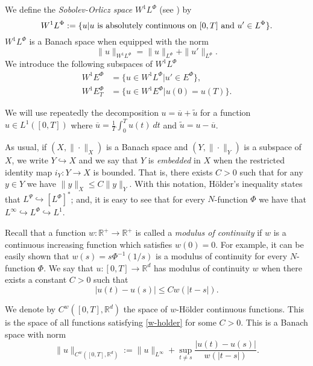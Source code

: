\documentclass[twoside]{article}
\theoremstyle{remark}
\newcommand{\orlnor}{\|_{L^{\Phi}}}
\newcommand{\lphi}{L^{\Phi}}
\newcommand{\lpsi}{L^{\Psi}}
\newcommand{\ephi}{E^{\Phi}}
\newcommand{\wphi}{W^{1}\lphi}
\newcommand{\wphie}{W^{1}\ephi}
\newcommand{\rr}{\mathbb{R}}
\renewcommand{\leq}{\leqslant}
\newcounter{example}
\begin{document}
We define the \emph{Sobolev-Orlicz space} $\wphi$ (see \cite{adams_sobolev}) by
\[\wphi:=\{u| u \hbox{ is absolutely continuous on $[0,T]$ and } u'\in \lphi\}.\]
$\wphi$ is a Banach space when equipped with the norm
\begin{equation}\label{def-norma-orlicz-sob}
\|  u  \|_{\wphi}= \|  u  \|_{\lphi} + \|u'\orlnor.
\end{equation}
We introduce the following subspaces of $\wphi$
\begin{equation}\label{def-esp-orlicz-sob-per}
\begin{split}
\wphie&=\{u\in\wphi|u'\in\ephi\},\\
\wphie_T&=\{u\in\wphie|u(0)=u(T)\}.
\end{split}
\end{equation}



We will use repeatedly the decomposition $u=\overline{u}+\widetilde{u}$ for a function $u\in L^1([0,T])$  where $\overline{u} =\frac1T\int_0^T u(t)\ dt$ and $\widetilde{u}=u-\overline{u}$.

As usual, if $(X,\|\cdot\|_X)$ is a Banach space and $(Y,\|\cdot \|_Y)$ is a subspace of $X$,  we write $Y\hookrightarrow X$ and we say that $Y$ is \emph{embedded} in $X$  when the restricted identity map $i_Y:Y\to X$ is bounded. That is, there exists $C>0$ such that  for any $y\in Y$ we have $\|y\|_X\leq C\|y\|_Y$.  With this notation, H\"older's inequality states that  $\lpsi\hookrightarrow  \left[\lphi\right]^*$; and, it is easy to see that for every $N$-function $\Phi$ we have that $L^{\infty}\hookrightarrow\lphi \hookrightarrow L^1$.


 Recall that a function   $w:\mathbb{R}^+\to \mathbb{R}^+$ is called  a \emph{modulus of continuity} if $w$ is a continuous increasing function which satisfies $w(0)=0$. For example, it can be easily shown that $w(s)=s\Phi^{-1}(1/s)$ is a modulus of  continuity for every $N$-function $\Phi$.  We say that $u:[0,T]\to\rr^d$  has modulus of continuity $w$  when there exists a constant $C>0$ such that
\begin{equation}\label{w-holder}|u(t)-u(s)|\leq Cw(|t-s|).
\end{equation}


We denote by $C^w([0,T],\rr^d)$  the space of  $w$-H\"older continuous functions. This is the space of all functions satisfying \eqref{w-holder} for some $C>0$. This is a Banach space with norm
\[\|u\|_{  C^w([0,T],\rr^d) }  :=\|u\|_{L^{\infty}}+\sup\limits_{t\neq s}\frac{|u(t)-u(s)|}{w(|t-s|)}.\]
\end{document}
